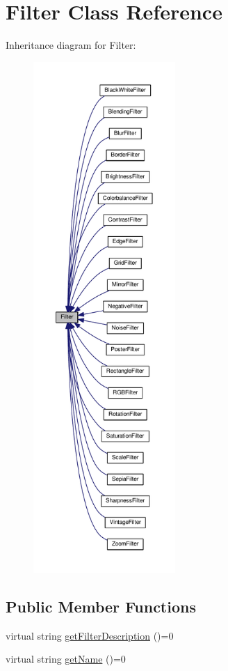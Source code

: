 \hypertarget{classModel_1_1Filter}{}\section{Filter Class Reference}
\label{classModel_1_1Filter}


Inheritance diagram for Filter\+:
\nopagebreak
\begin{figure}[H]
\begin{center}
\leavevmode
\includegraphics[height=550pt]{classModel_1_1Filter__inherit__graph}
\end{center}
\end{figure}
\subsection*{Public Member Functions}
\begin{DoxyCompactItemize}
\item 
virtual string \hyperlink{classModel_1_1Filter_a453fcafa809afa1ce58d9ef95d5f26c0}{get\+Filter\+Description} ()=0
\item 
virtual string \hyperlink{classModel_1_1Filter_ade93aa98c68d185a9c03784d36140225}{get\+Name} ()=0
\end{DoxyCompactItemize}

